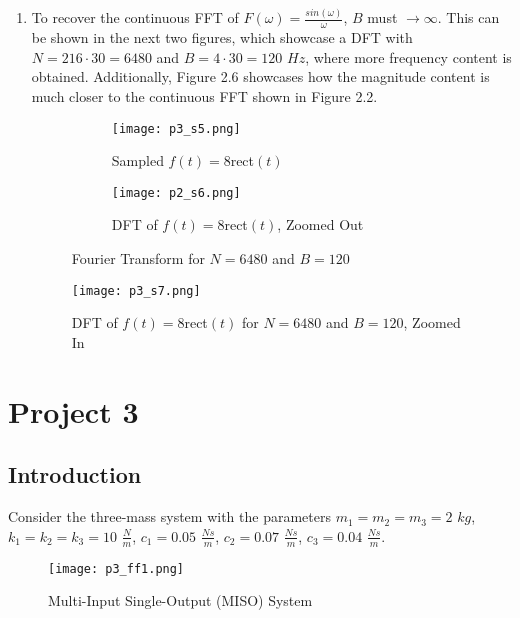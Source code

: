 \documentclass{article}
\begin{document}
\begin{enumerate}
    \item To recover the continuous FFT of $F(\omega)=\frac{sin(\omega)}{\omega}$, $B$ must $\rightarrow \infty$. This can be shown in the next two figures, which showcase a DFT with $N=216\cdot30=6480$ and $B=4\cdot 30=120$ $Hz$, where more frequency content is obtained. Additionally, Figure 2.6 showcases how the magnitude content is much closer to the continuous FFT shown in Figure 2.2.

    \begin{figure}[h]
        \centering
        \begin{subfigure}{.5\textwidth}
          \centering
          \texttt{[image: p3\_s5.png]}
          \caption{Sampled $f(t)=8$rect$(t)$}
          \label{fig:sub1}
        \end{subfigure}%
        \begin{subfigure}{.5\textwidth}
          \centering
          \texttt{[image: p2\_s6.png]}
          \caption{DFT of $f(t)=8$rect$(t)$, Zoomed Out}
          \label{fig:sub2}
        \end{subfigure}
        \caption{Fourier Transform for $N=6480$ and $B=120$}
        \label{fig:test}
    \end{figure}

    \begin{figure}[h]
        \centering
        \texttt{[image: p3\_s7.png]}
        \caption{DFT of $f(t)=8$rect$(t)$ for $N=6480$ and $B=120$, Zoomed In}
        \label{fig:enter-label}
    \end{figure}

\clearpage

\end{enumerate}

\newpage

\section{Project 3}
\subsection{Introduction}

Consider the three-mass system with the parameters $m_1=m_2=m_3=2$ $kg$, $k_1=k_2=k_3=10$ $\frac{N}{m}$, $c_1=0.05$ $\frac{Ns}{m}$, $c_2=0.07$ $\frac{Ns}{m}$, $c_3=0.04$ $\frac{Ns}{m}$.

\begin{figure}[h]
    \centering
    \texttt{[image: p3\_ff1.png]}
    \caption{Multi-Input Single-Output (MISO) System}
    \label{fig:enter-label}
\end{figure}
\end{document}
